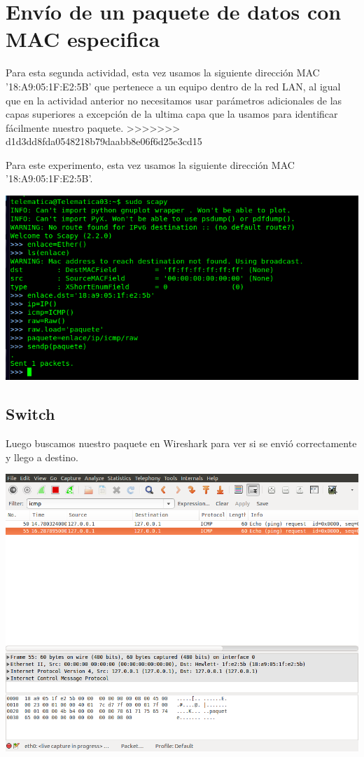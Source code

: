 \documentclass[spanish]{udpreport}
\begin{document}
\section{Envío de un paquete de datos con MAC especifica}

Para esta segunda actividad, esta vez usamos la siguiente dirección MAC '18:A9:05:1F:E2:5B' que pertenece a un equipo dentro de la red LAN, al igual que en la actividad anterior no necesitamos usar parámetros adicionales de las capas superiores a excepción de la ultima capa que la usamos para identificar fácilmente nuestro paquete.
>>>>>>> d1d3dd8fda0548218b79daabb8e06f6d25e3cd15

Para este experimento, esta vez usamos la siguiente dirección MAC '18:A9:05:1F:E2:5B'.
\begin{center}
	\includegraphics[scale=.37]{imagenes/Switch/Test_2.png}
\end{center}

\newpage
\subsection{Switch}

Luego buscamos nuestro paquete en Wireshark para ver si se envió correctamente y llego a destino.

\begin{center}
	\includegraphics[scale=.37]{imagenes/Switch/Test_2_Wireshark.png}
\end{center}
\end{document}
